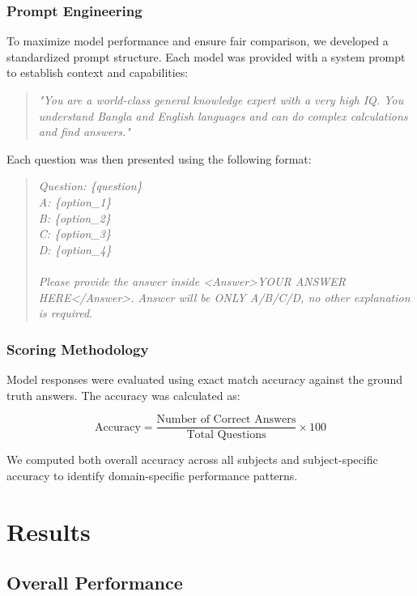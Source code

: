 \documentclass[11pt,a4paper]{article}
\begin{document}
\subsubsection{Prompt Engineering}

To maximize model performance and ensure fair comparison, we developed a standardized prompt structure. Each model was provided with a system prompt to establish context and capabilities:

\begin{quote}
\textit{"You are a world-class general knowledge expert with a very high IQ. You understand Bangla and English languages and can do complex calculations and find answers."}
\end{quote}

Each question was then presented using the following format:

\begin{quote}
\textit{Question: \{question\}\\
A: \{option\_1\}\\
B: \{option\_2\}\\
C: \{option\_3\}\\
D: \{option\_4\}\\
\\
Please provide the answer inside <Answer>YOUR ANSWER HERE</Answer>. Answer will be ONLY A/B/C/D, no other explanation is required.}
\end{quote}

\subsubsection{Scoring Methodology}

Model responses were evaluated using exact match accuracy against the ground truth answers. The accuracy was calculated as:

\begin{equation}
\text{Accuracy} = \frac{\text{Number of Correct Answers}}{\text{Total Questions}} \times 100
\end{equation}

We computed both overall accuracy across all subjects and subject-specific accuracy to identify domain-specific performance patterns.

\section{Results}

\subsection{Overall Performance}
\end{document}
